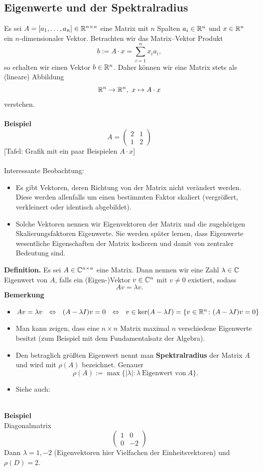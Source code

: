 \subsection{Eigenwerte und der Spektralradius}
Es sei $A = [a_1,\ldots, a_n]\in{\mathbb{R}}^{n\times n}$ eine Matrix mit $n$ Spalten $a_i \in {\mathbb{R}}^{n}$ und $x \in {\mathbb{R}}^{n}$ ein $n$-dimensionaler Vektor. Betrachten wir das Matrix--Vektor Produkt 
$$b := A\cdot x = \sum_{i=1}^n x_i a_i,$$
so erhalten wir einen Vektor $b \in {\mathbb{R}}^{n}$. Daher können wir eine Matrix stets als (lineare) Abbildung 
$${\mathbb{R}}^{n} \to {\mathbb{R}}^{n}, ~x \mapsto A\cdot x $$
verstehen.~\\~\\
\textbf{Beispiel}\\
$$
A = \begin{pmatrix}
   2 & 1\\1&2
\end{pmatrix}
$$
[Tafel: Grafik mit ein paar Beispielen $A\cdot x$]\\~\\
Interessante Beobachtung: 
\begin{itemize}
	\item Es gibt Vektoren, deren Richtung von der Matrix nicht verändert werden. Diese werden allenfalls um einen bestimmten Faktor skaliert (vergrößert, verkleinert oder identisch abgebildet). 
	\item Solche Vektoren nennen wir Eigenvektoren der Matrix und die zugehörigen Skalierungsfaktoren Eigenwerte. Sie werden später lernen, dass Eigenwerte wesentliche Eigenschaften der Matrix kodieren und damit von zentraler Bedeutung sind.
\end{itemize}
\textbf{Definition.} Es sei $A\in {\mathbb{C}}^{n \times n}$ eine Matrix. Dann nennen wir eine Zahl $\lambda \in {\mathbb{C}}$ Eigenwert von $A$, falls ein (Eigen-)Vektor $v \in  {\mathbb{C}}^n$ mit $v \neq 0$ existiert, sodass 
$$Av = \lambda v. $$
%
\textbf{Bemerkung}
\begin{itemize}
	\item $Av = \lambda v ~~\Leftrightarrow~~ (A-\lambda I)v = 0 ~~\Leftrightarrow~~ v \in \text{ker}(A-\lambda I)=\{v \in {\mathbb{R}}^{n}\colon (A-\lambda I)v = 0\} $
	\item Man kann zeigen, dass eine $n \times n$ Matrix maximal $n$ verschiedene Eigenwerte besitzt (zum Beispiel mit dem Fundamentalsatz der Algebra). 
	\item Den betraglich größten Eigenwert nennt man \textbf{Spektralradius} der Matrix $A$ und wird mit $\rho(A)$ bezeichnet. Genauer
	$$\rho(A) := \max\{|\lambda|: \lambda ~\text{Eigenwert von}~A\} .$$
	\item Siehe auch: \cite[Def. 2.30]{Meister}
\end{itemize}
~\\
\textbf{Beispiel}\\
Diagonalmatrix $$\begin{pmatrix}
1&0\\0&-2
\end{pmatrix} $$
Dann $\lambda = 1,-2$ (Eigenvektoren hier Vielfachen der Einheitsvektoren) und $\rho(D) = 2$.


